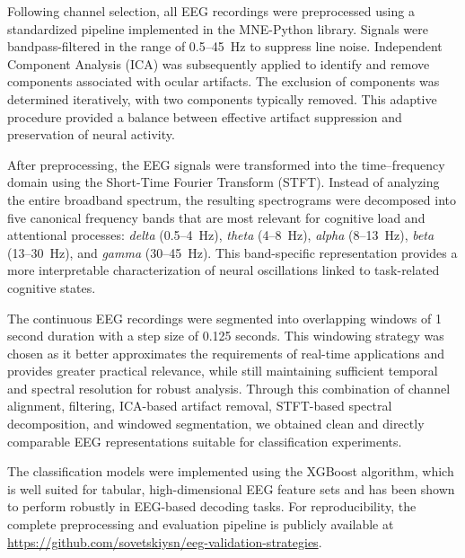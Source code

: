 \documentclass[utf8]{FrontiersinHarvard} %
\begin{document}
Following channel selection, all EEG recordings were preprocessed using a standardized pipeline implemented in the MNE-Python library. Signals were bandpass-filtered in the range of 0.5--45~Hz to suppress line noise. Independent Component Analysis (ICA) was subsequently applied to identify and remove components associated with ocular artifacts. The exclusion of components was determined iteratively, with two components typically removed. This adaptive procedure provided a balance between effective artifact suppression and preservation of neural activity.

After preprocessing, the EEG signals were transformed into the time--frequency domain using the Short-Time Fourier Transform (STFT). Instead of analyzing the entire broadband spectrum, the resulting spectrograms were decomposed into five canonical frequency bands that are most relevant for cognitive load and attentional processes: \textit{delta} (0.5--4~Hz), \textit{theta} (4--8~Hz), \textit{alpha} (8--13~Hz), \textit{beta} (13--30~Hz), and \textit{gamma} (30--45~Hz). This band-specific representation provides a more interpretable characterization of neural oscillations linked to task-related cognitive states.

The continuous EEG recordings were segmented into overlapping windows of 1 second duration with a step size of 0.125 seconds. This windowing strategy was chosen as it better approximates the requirements of real-time applications and provides greater practical relevance, while still maintaining sufficient temporal and spectral resolution for robust analysis. Through this combination of channel alignment, filtering, ICA-based artifact removal, STFT-based spectral decomposition, and windowed segmentation, we obtained clean and directly comparable EEG representations suitable for classification experiments.

The classification models were implemented using the XGBoost algorithm, which is well suited for tabular, high-dimensional EEG feature sets and has been shown to perform robustly in EEG-based decoding tasks. For reproducibility, the complete preprocessing and evaluation pipeline is publicly available at \url{https://github.com/sovetskiysn/eeg-validation-strategies}.
\end{document}
